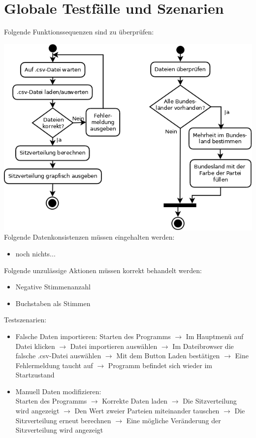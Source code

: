 \documentclass[10pt,a4paper]{article}
\begin{document}
\section{Globale Testfälle und Szenarien}
Folgende Funktionssequenzen sind zu überprüfen:

\includegraphics[scale=0.4]{Diagramm1} \\
Folgende Datenkonsistenzen müssen eingehalten werden:
\begin{itemize}
	\item noch nichts...
\end{itemize}
Folgende unzulässige Aktionen müssen korrekt behandelt werden:
\begin{itemize}
	\item Negative Stimmenanzahl
	\item Buchstaben als Stimmen
\end{itemize}
Testszenarien:
\begin{itemize}
	\item Falsche Daten importieren: \newline
	Starten des Programms $\rightarrow$ Im Hauptmenü auf Datei klicken $\rightarrow$ Datei importieren auswählen $\rightarrow$ Im Dateibrowser die falsche .csv-Datei auswählen $\rightarrow$ Mit dem Button Laden bestätigen $\rightarrow$ Eine Fehlermeldung taucht auf $\rightarrow$ Programm befindet sich wieder im Startzustand
	\item Manuell Daten modifizieren: \\
	Starten des Programms $\rightarrow$ Korrekte Daten laden $\rightarrow$ Die Sitzverteilung wird angezeigt $\rightarrow$ Den Wert zweier Parteien miteinander tauschen $\rightarrow$ Die Sitzverteilung erneut berechnen $\rightarrow$ Eine mögliche Veränderung der Sitzverteilung wird angezeigt
	
\end{itemize}
\end{document}
